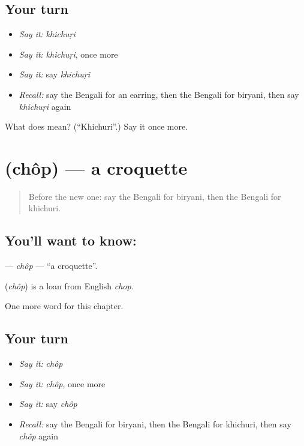\subsection*{Your turn}
\begin{itemize}
\raggedright
  \item \emph{Say it:} \emph{khichuṛi}
  \item \emph{Say it:} \emph{khichuṛi}, once more
  \item \emph{Say it:} say \emph{khichuṛi}
  \item \emph{Recall:} say the Bengali for an earring, then the Bengali for biryani, then say \emph{khichuṛi} again
\end{itemize}

\begin{tcolorbox}[breakable,colback=teal!4,colframe=teal!35!black,title={Before you move on}]
What does  mean? (\textquotedblleft{}Khichuri\textquotedblright{}.) Say it once more.
\end{tcolorbox}
\section[\texorpdfstring{\bn{চপ} (chôp)}{চপ (chôp)}]{ (chôp) — a croquette}

\label{lesson:BN-C196-chop}



\begin{quote}
Before the new one: say the Bengali for biryani, then the Bengali for khichuri.
\end{quote}

\subsection*{You'll want to know: }
\textbf{} — \emph{chôp} — \textquotedblleft{}a croquette\textquotedblright{}.

\begin{cousinweb}
\textbf{} (\emph{chôp}) is a loan from English \emph{chop}.
\end{cousinweb}

\begin{grammarlens}[title={What you've built}]
One more word for this chapter.
\end{grammarlens}

\subsection*{Your turn}
\begin{itemize}
\raggedright
  \item \emph{Say it:} \emph{chôp}
  \item \emph{Say it:} \emph{chôp}, once more
  \item \emph{Say it:} say \emph{chôp}
  \item \emph{Recall:} say the Bengali for biryani, then the Bengali for khichuri, then say \emph{chôp} again
\end{itemize}

